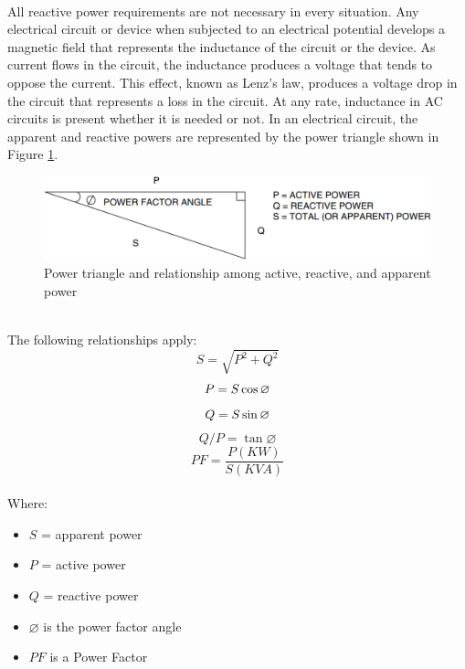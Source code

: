 \documentclass[12pt,fleqn]{book} %
\begin{document}
\\ All reactive power requirements are not necessary in every situation. Any electrical circuit or device when subjected to an electrical potential develops a magnetic field that represents the inductance of the circuit or the device. As current flows in the circuit, the inductance produces a voltage that tends to oppose the current. This effect, known as Lenz’s law, produces a voltage drop in the circuit that represents a loss in the circuit. At any rate, inductance in AC circuits is present whether it is needed or not. In an electrical circuit, the apparent and reactive powers are represented by the power triangle shown in Figure \ref{fig:pf 1}. 
\begin{figure}[!h]
    \centering
    \includegraphics[width=1\linewidth]{pf 1.png}
    \caption{Power triangle and relationship among active, reactive, and apparent power}
    \label{fig:pf 1}
    \end{figure}
    \\ The following relationships apply:
    \begin{equation}
        S=\sqrt{P^{2}+Q^{2}}
    \end{equation}
    \begin{equation}
        P=S\displaystyle \displaystyle \cos \varnothing 
    \end{equation}
    \begin{equation}
        Q=S\displaystyle \displaystyle \sin \varnothing 
    \end{equation}
    \begin{equation}
        Q/P= \tan \varnothing 
    \end{equation}
    \begin{equation}
        PF=\frac{P(KW)}{S(KVA)}
    \end{equation}
    \\ Where:
    \begin{itemize}
        \item  $S$ = apparent power
        \item $P$ = active power
        \item $Q$ = reactive power
        \item  $\varnothing$ is the power factor angle
        \item $PF$ is a Power Factor
    \end{itemize}
\end{document}
